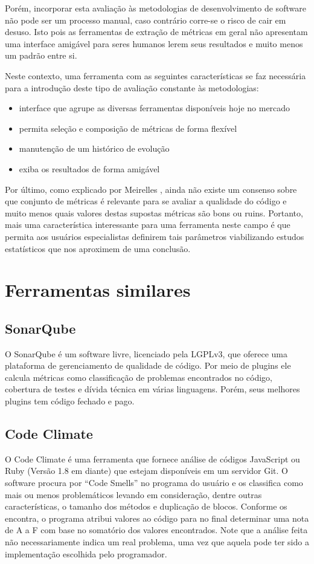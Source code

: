 \documentclass[12pt]{article}
\begin{document}
Porém, incorporar esta avaliação às metodologias de desenvolvimento de software não pode ser um processo manual, caso contrário corre-se o risco de cair em desuso. Isto pois as ferramentas de extração de métricas em geral não apresentam uma interface amigável para seres humanos lerem seus resultados e muito menos um padrão entre si.

Neste contexto, uma ferramenta com as seguintes características se faz necessária para a introdução deste tipo de avaliação constante às metodologias:

\begin{itemize}
  \item interface que agrupe as diversas ferramentas disponíveis hoje no mercado
  \item permita seleção e composição de métricas de forma flexível
  \item manutenção de um histórico de evolução
  \item exiba os resultados de forma amigável
\end{itemize}

Por último, como explicado por Meirelles \cite{m13}, ainda não existe um consenso sobre que conjunto de métricas é relevante para se avaliar a qualidade do código e muito menos quais valores destas supostas métricas são bons ou ruins. Portanto, mais uma característica interessante para uma ferramenta neste campo é que permita aos usuários especialistas definirem tais parâmetros viabilizando estudos estatísticos que nos aproximem de uma conclusão.

\section{Ferramentas similares}

  \subsection{SonarQube}
  O SonarQube é um software livre, licenciado pela LGPLv3, que oferece uma plataforma de gerenciamento de qualidade de código. Por meio de plugins ele calcula métricas como classificação de problemas encontrados no código, cobertura de testes e dívida técnica em várias linguagens. Porém, seus melhores plugins tem código fechado e pago.

  \subsection{Code Climate}
  O Code Climate é uma ferramenta que fornece análise de códigos JavaScript ou Ruby (Versão 1.8 em diante) que estejam disponíveis em um servidor Git.
  O software procura por ``Code Smells'' no programa do usuário e os classifica como mais ou menos problemáticos levando em consideração, dentre outras características, o tamanho dos métodos e duplicação de blocos. Conforme os encontra, o programa atribui valores ao código para no final determinar uma nota de A a F com base no somatório dos valores encontrados. Note que a análise feita não necessariamente indica um real problema, uma vez que aquela pode ter sido a implementação escolhida pelo programador. 
\end{document}
